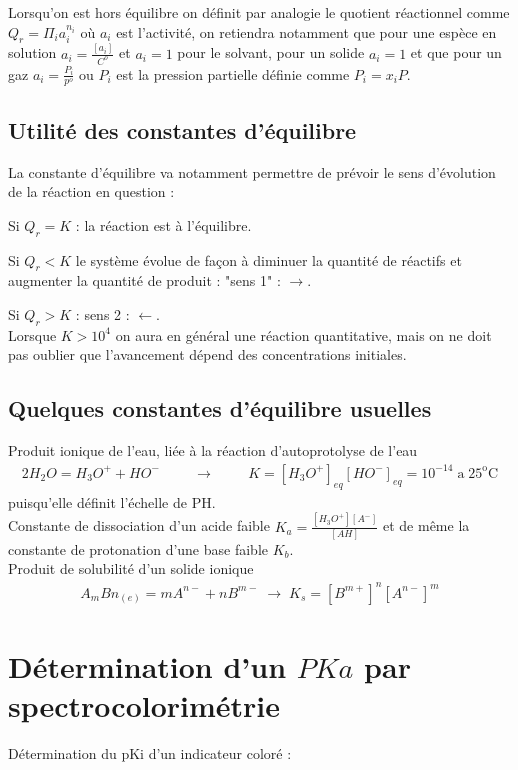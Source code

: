 \documentclass[12pt,prb,aps,epsf]{article}
\begin{document}
Lorsqu'on est hors équilibre on définit par analogie le quotient réactionnel comme $Q_r = \Pi_{i}a_i^{n_i}$ où $a_i$ est l'activité, on retiendra notamment que pour une espèce en solution $a_i=\frac{[a_i]}{C^o}$ et $a_i=1$ pour le solvant, pour un solide $a_i =1$ et que pour un gaz $a_i = \frac{P_i}{p^o}$ ou $P_i$ est la pression partielle définie comme $P_i = x_iP$. 
\subsection{Utilité des constantes d'équilibre}
La constante d'équilibre va notamment permettre de prévoir le sens d'évolution de la réaction en question :

Si $Q_r=K$ : la réaction est à l'équilibre.

Si $Q_r<K$ le système évolue de façon à diminuer la quantité de réactifs et augmenter la quantité de produit : "sens 1" : $\rightarrow$.

Si $Q_r>K$ : sens 2 : $\leftarrow$.\\
Lorsque $K>10^4$ on aura en général une réaction quantitative, mais on ne doit pas oublier que l'avancement dépend des concentrations initiales.

\subsection{Quelques constantes d'équilibre usuelles}
Produit ionique de l'eau, liée à la réaction d'autoprotolyse de l'eau
\begin{eqnarray}
2H_2O = H_3O^+ + HO^-\hspace{1cm}\rightarrow\hspace{1cm} K = [H_3O^+]_{eq}[HO^-]_{eq} = 10^{-14} \;\mathrm{a\; 25^{o}C}
\end{eqnarray}
puisqu'elle définit l'échelle de PH.\\

Constante de dissociation d'un acide faible $K_a = \frac{[H_3O^+][A^-]}{[AH]}$ et de même la constante de protonation d'une base faible $K_b$.\\

Produit de solubilité d'un solide ionique
\begin{eqnarray}
A_mBn_{(e)} = mA^{n-} + nB^{m-} \; \rightarrow \; K_s = [B^{m+}]^n[A^{n-}]^m
\end{eqnarray}

\section{Détermination d'un $PKa$ par spectrocolorimétrie}
Détermination du pKi d'un indicateur coloré :\\
\end{document}
